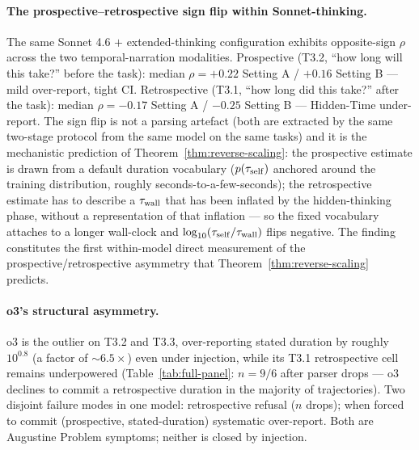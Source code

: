 \paragraph{The prospective--retrospective sign flip within Sonnet-thinking.}
The same Sonnet 4.6 $+$ extended-thinking configuration exhibits opposite-sign $\rho$ across the two temporal-narration modalities. Prospective (T3.2, ``how long will this take?'' before the task): median $\rho = +0.22$ Setting A / $+0.16$ Setting B --- mild over-report, tight CI. Retrospective (T3.1, ``how long did this take?'' after the task): median $\rho = -0.17$ Setting A / $-0.25$ Setting B --- Hidden-Time under-report. The sign flip is not a parsing artefact (both are extracted by the same two-stage protocol from the same model on the same tasks) and it is the mechanistic prediction of Theorem~\ref{thm:reverse-scaling}: the prospective estimate is drawn from a default duration vocabulary ($p(\tau_{\mathrm{self}})$ anchored around the training distribution, roughly seconds-to-a-few-seconds); the retrospective estimate has to describe a $\tau_{\mathrm{wall}}$ that has been inflated by the hidden-thinking phase, without a representation of that inflation --- so the fixed vocabulary attaches to a longer wall-clock and $\log_{10}(\tau_{\mathrm{self}}/\tau_{\mathrm{wall}})$ flips negative. The finding constitutes the first within-model direct measurement of the prospective/retrospective asymmetry that Theorem~\ref{thm:reverse-scaling} predicts.

\paragraph{o3's structural asymmetry.}
o3 is the outlier on T3.2 and T3.3, over-reporting stated duration by roughly $10^{0.8}$ (a factor of $\sim 6.5\times$) even under injection, while its T3.1 retrospective cell remains underpowered (Table~\ref{tab:full-panel}: $n=9/6$ after parser drops --- o3 declines to commit a retrospective duration in the majority of trajectories). Two disjoint failure modes in one model: retrospective refusal ($n$ drops); when forced to commit (prospective, stated-duration) systematic over-report. Both are Augustine Problem symptoms; neither is closed by injection.

